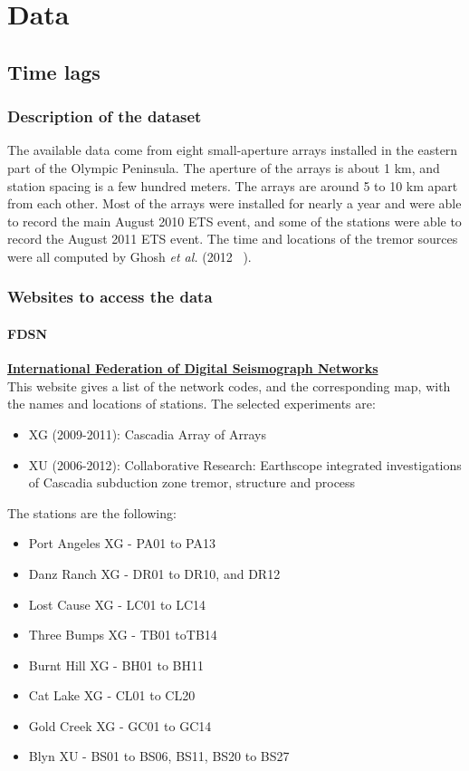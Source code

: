 \documentclass[main.tex]{subfiles}
\begin{document}
\part{Data}

\chapter{Time lags}

\section{Description of the dataset}

The available data come from eight small-aperture arrays installed in the eastern part of the Olympic Peninsula. The aperture of the arrays is about 1 km, and station spacing is a few hundred meters. The arrays are around 5 to 10 km apart from each other. Most of the arrays were installed for nearly a year and were able to record the main August 2010 ETS event, and some of the stations were able to record the August 2011 ETS event. The time and locations of the tremor sources were all computed by Ghosh \textit{et al.} (2012 ~\cite{GHO_2012}).

\section{Websites to access the data}

\subsection{FDSN}

\href{http://www.fdsn.org/networks/}{\textbf{International Federation of Digital Seismograph Networks}} \\

This website gives a list of the network codes, and the corresponding map, with the names and locations of stations. The selected experiments are:
\begin{itemize}
	\item XG (2009-2011): Cascadia Array of Arrays
	\item XU (2006-2012): Collaborative Research: Earthscope integrated investigations of Cascadia subduction zone tremor, structure and process
\end{itemize}

The stations are the following:
\begin{itemize}
	\item Port Angeles XG - PA01 to PA13
	\item Danz Ranch XG - DR01 to DR10, and DR12
	\item Lost Cause XG - LC01 to LC14
	\item Three Bumps XG - TB01 toTB14
	\item Burnt Hill XG - BH01 to BH11
	\item Cat Lake XG - CL01 to CL20
	\item Gold Creek XG - GC01 to GC14
	\item Blyn XU - BS01 to BS06, BS11, BS20 to BS27
\end{itemize}
\end{document}
